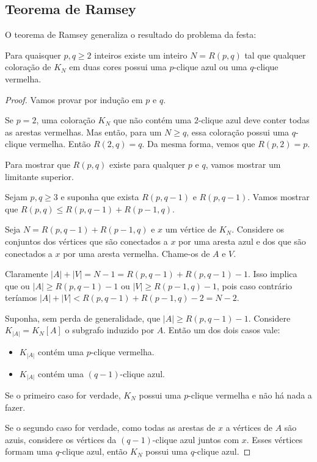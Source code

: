 \subsection {Teorema de Ramsey}
O teorema de Ramsey generaliza o resultado do problema da festa:

\begin{teorema}
    Para quaisquer $p,q\geq2$ inteiros existe um inteiro $N=R(p,q)$ tal que qualquer coloração de $K_N$ em duas cores possui uma $p$-clique azul ou uma $q$-clique vermelha.
\end{teorema}
\begin{proof}
    Vamos provar por indução em $p$ e $q$.

    Se $p=2$, uma coloração $K_N$ que não contém uma $2$-clique azul deve conter todas as arestas vermelhas. Mas então, para um $N\geq q$, essa coloração possui uma $q$-clique vermelha. Então $R(2,q)=q$. Da mesma forma, vemos que $R(p,2)=p$.

    Para mostrar que $R(p,q)$ existe para qualquer $p$ e $q$, vamos mostrar um limitante superior.

    Sejam $p,q\geq3$ e suponha que exista $R(p,q-1)$ e $R(p,q-1)$. Vamos mostrar que $R(p,q)\leq R(p,q-1)+R(p-1,q)$.

    Seja $N=R(p,q-1)+R(p-1,q)$ e $x$ um vértice de $K_N$. Considere os conjuntos dos vértices que são conectados a $x$ por uma aresta azul e dos que são conectados a $x$ por uma aresta vermelha. Chame-os de $A$ e $V$.

    Claramente $|A|+|V|=N-1=R(p,q-1)+R(p,q-1)-1$. Isso implica que ou $|A|\geq R(p,q-1)-1$ ou $|V|\geq R(p-1,q)-1$, pois caso contrário teríamos $|A|+|V|<R(p,q-1)+R(p-1,q)-2=N-2$.

    Suponha, sem perda de generalidade, que $|A|\geq R(p,q-1)-1$. Considere $K_{|A|}=K_N[A]$ o subgrafo induzido por $A$. Então um dos dois casos vale:
    \begin{itemize}
        \item $K_{|A|}$ contém uma $p$-clique vermelha.
        \item $K_{|A|}$ contém uma $(q-1)$-clique azul.
    \end{itemize}
    Se o primeiro caso for verdade, $K_N$ possui uma $p$-clique vermelha e não há nada a fazer.

    Se o segundo caso for verdade, como todas as arestas de $x$ a vértices de $A$ são azuis, considere os vértices da $(q-1)$-clique azul juntos com $x$. Esses vértices formam uma $q$-clique azul, então $K_N$ possui uma $q$-clique azul.
\end{proof}

